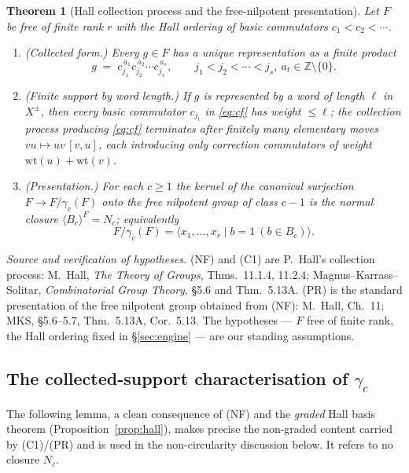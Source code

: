 \documentclass{amsart}
\newtheorem{theorem}{Theorem}
\theoremstyle{definition}
\theoremstyle{remark}
\begin{document}
\begin{theorem}[Hall collection process and the free-nilpotent presentation]
\label{thm:collection}
Let $F$ be free of finite rank $r$ with the Hall ordering of basic commutators
$c_1<c_2<\cdots$.
\begin{enumerate}
\item[\textup{(NF)}] \textup{(Collected form.)} Every $g\in F$ has a unique
representation as a \emph{finite} product
\begin{equation}\label{eq:cf}
g \;=\; c_{j_1}^{\,a_1}c_{j_2}^{\,a_2}\cdots c_{j_s}^{\,a_s},
\qquad j_1<j_2<\cdots<j_s,\ a_t\in\mathbb Z\setminus\{0\}.
\end{equation}
\item[\textup{(C1)}] \textup{(Finite support by word length.)} If $g$ is represented by
a word of length $\ell$ in $X^{\pm}$, then every basic commutator $c_{j_t}$ in
\eqref{eq:cf} has weight $\le\ell$; the collection process producing \eqref{eq:cf}
terminates after finitely many elementary moves $vu\mapsto uv\,[v,u]$, each introducing
only correction commutators of weight $\mathrm{wt}(u)+\mathrm{wt}(v)$.
\item[\textup{(PR)}] \textup{(Presentation.)} For each $c\ge1$ the kernel of the
canonical surjection $F\to F/\gamma_c(F)$ onto the free nilpotent group of class $c-1$
is the normal closure $\langle B_c\rangle^{F}=N_c$; equivalently
\begin{equation}\label{eq:hallpres}
F/\gamma_c(F)=\big\langle x_1,\dots,x_r \;\big|\; b=1\ (b\in B_c)\big\rangle .
\end{equation}
\end{enumerate}
\end{theorem}
\noindent\emph{Source and verification of hypotheses.} (NF) and (C1) are P.~Hall's
collection process: M.~Hall, \emph{The Theory of Groups}, Thms.~11.1.4, 11.2.4;
Magnus--Karrass--Solitar, \emph{Combinatorial Group Theory}, \S5.6 and Thm.~5.13A. (PR)
is the standard presentation of the free nilpotent group obtained from (NF): M.~Hall,
Ch.~11; MKS, \S5.6--5.7, Thm.~5.13A, Cor.~5.13. The hypotheses --- $F$ free of finite
rank, the Hall ordering fixed in \S\ref{sec:engine} --- are our standing assumptions.

\subsection*{The collected-support characterisation of $\gamma_c$}

The following lemma, a clean consequence of (NF) and the \emph{graded} Hall basis
theorem (Proposition~\ref{prop:hall}), makes precise the non-graded content carried by
(C1)/(PR) and is used in the non-circularity discussion below. It refers to no closure
$N_c$.
\end{document}
